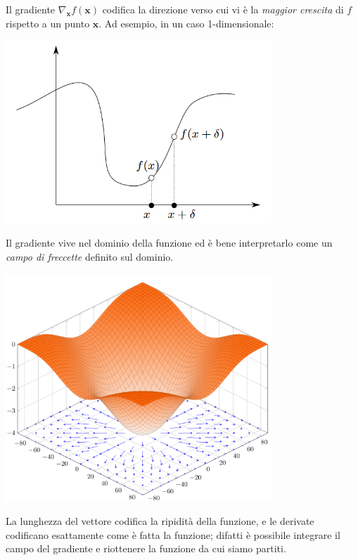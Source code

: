 \documentclass{article}
\begin{document}
        \newpage

        Il gradiente $\nabla_\mathbf{x}f(\mathbf{x})$ codifica la direzione verso cui vi è la \emph{maggior crescita} di $f$ rispetto a un punto 
        $\mathbf{x}$. Ad esempio, in un caso 1-dimensionale:
        \begin{center}\includegraphics[width=10cm]{gradient.png}\end{center}

        Il gradiente vive nel dominio della funzione ed è bene interpretarlo come un \emph{campo di freccette} definito sul dominio.
        \begin{center}\includegraphics[width=10cm]{gradient_2.png}\end{center}
        La lunghezza del vettore codifica la ripidità della funzione, e le derivate codificano esattamente come è fatta la funzione; 
        difatti è possibile integrare il campo del gradiente e riottenere la funzione da cui siamo partiti.
\end{document}
